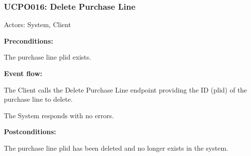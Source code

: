 \begin{ucbox}{\subsubsection{UCPO016: Delete Purchase Line}}
\label{UCPO016}

Actors: System, Client

\textbf{Preconditions:}

\ucitem The purchase line plid exists.

\textbf{Event flow:}

\ucitem The Client calls the Delete Purchase Line endpoint providing the ID (plid) of the purchase line to delete.

\ucitem The System responds with no errors.

\textbf{Postconditions:}

\ucitem The purchase line plid has been deleted and no longer exists in the system.

\end{ucbox}
\newpage